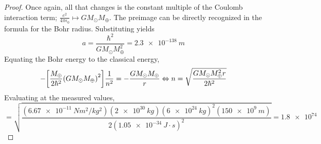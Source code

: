 \documentclass{article}
\begin{document}
\begin{proof}
  Once again, all that changes is the constant multiple of the Coulomb interaction term;
  $\frac{e^{2}}{4\pi\epsilon_{0}} \mapsto {GM_{\odot}M_{\oplus}}$.
  The preimage can be directly recognized in the formula for the Bohr radius.
  Substituting yields
  \[
    a = \frac{\hbar^{2}}{GM_{\odot}M^{2}_{\oplus}} = \SI{2.3e-138}{m}
  \]
  Equating the Bohr energy to the classical energy,
  \[
    -\qty[\frac{M_{\oplus}}{2\hbar^{2}}\qty({GM_{\odot}M_{\oplus}})^{2}]\frac{1}{n^{2}} = -\frac{GM_{\odot}M_{\oplus}}{r}
    \Leftrightarrow n = \sqrt{\frac{GM_{\odot}M^{2}_{\oplus}r}{2\hbar^{2}}}
  \]
  Evaluating at the measured values,
  \[
    = \sqrt{\frac{(\SI{6.67e-11}{N m^{2}/kg^{2}})(\SI{2e30}{kg})(\SI{6e24}{kg})^{2}(\SI{150e9}{m})}{2(\SI{1.05e-34}{J\cdot s})^{2}}}
    = \SI{1.8e74}{}
  \]
\end{proof}
\end{document}
